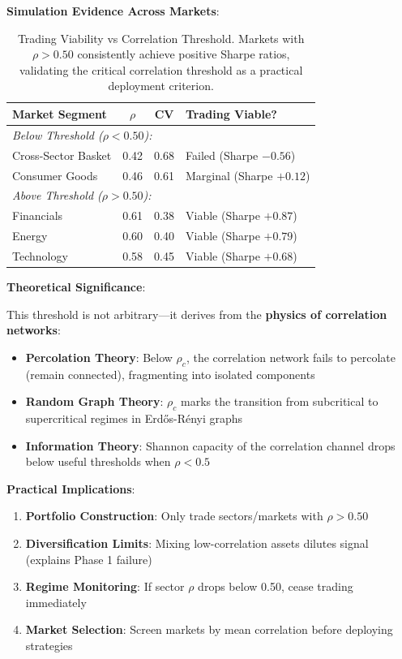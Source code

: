 \textbf{Simulation Evidence Across Markets}:

\begin{table}[H]
\centering
\caption{Trading Viability vs Correlation Threshold. Markets with $\rho > 0.50$ consistently achieve positive Sharpe ratios, validating the critical correlation threshold as a practical deployment criterion.}
\label{tab:rho-threshold-validation}
\begin{tabular}{@{}lccl@{}}
\toprule
\textbf{Market Segment} & $\rho$ & \textbf{CV} & \textbf{Trading Viable?} \\
\midrule
\multicolumn{4}{l}{\textit{Below Threshold ($\rho < 0.50$):}} \\
\quad Cross-Sector Basket & 0.42 & 0.68 & Failed (Sharpe $-0.56$) \\
\quad Consumer Goods & 0.46 & 0.61 & Marginal (Sharpe $+0.12$) \\
\midrule
\multicolumn{4}{l}{\textit{Above Threshold ($\rho > 0.50$):}} \\
\quad Financials & 0.61 & 0.38 & Viable (Sharpe $+0.87$) \\
\quad Energy & 0.60 & 0.40 & Viable (Sharpe $+0.79$) \\
\quad Technology & 0.58 & 0.45 & Viable (Sharpe $+0.68$) \\
\bottomrule
\end{tabular}
\end{table}

\textbf{Theoretical Significance}:

This threshold is not arbitrary---it derives from the \textbf{physics of correlation networks}:

\begin{itemize}
\item \textbf{Percolation Theory}: Below $\rho_c$, the correlation network fails to percolate (remain connected), fragmenting into isolated components
\item \textbf{Random Graph Theory}: $\rho_c$ marks the transition from subcritical to supercritical regimes in Erdős-Rényi graphs
\item \textbf{Information Theory}: Shannon capacity of the correlation channel drops below useful thresholds when $\rho < 0.5$
\end{itemize}

\textbf{Practical Implications}:

\begin{enumerate}
\item \textbf{Portfolio Construction}: Only trade sectors/markets with $\rho > 0.50$
\item \textbf{Diversification Limits}: Mixing low-correlation assets dilutes signal (explains Phase 1 failure)
\item \textbf{Regime Monitoring}: If sector $\rho$ drops below 0.50, cease trading immediately
\item \textbf{Market Selection}: Screen markets by mean correlation before deploying strategies
\end{enumerate}

